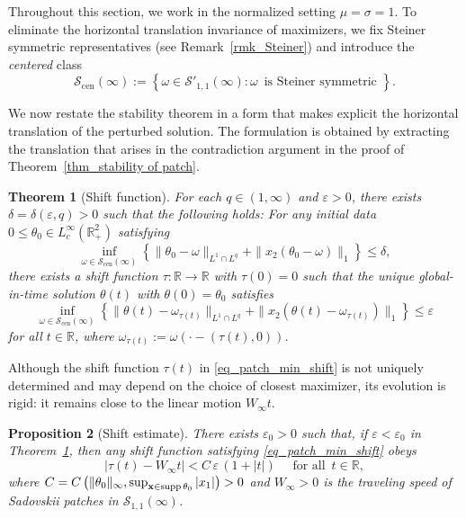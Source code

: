 \documentclass[11pt]{amsart}
\newtheorem{theorem}{Theorem}[section]
\newtheorem{proposition}[theorem]{Proposition}
\theoremstyle{definition}
\theoremstyle{definition}
\numberwithin{equation}{section}
\newcommand{\nrm}[1]{\Vert#1\Vert}
\newcommand{\supp}{{\mathrm{supp}}\,}
\newcommand{\0}{\emptyset}
\newcommand{\dlt}{\delta}
\newcommand{\tht}{\theta}
\newcommand{\omg}{\omega}
\newcommand{\bfx}{{\bf x}}
\newcommand{\bbR}{\mathbb R}
\newcommand{\calS}{\mathcal S}
\newcommand{\ift}{\infty}
\begin{document}
			
			Throughout this section, we work in the normalized setting $\mu = \sigma = 1$.
			To eliminate the horizontal translation invariance of maximizers, we fix Steiner symmetric representatives (see Remark~\ref{rmk_Steiner}) and introduce the \emph{centered} class
			\[
			\calS_{\mathrm{cen}}(\infty)
			:= \left\{
			\omega \in \calS'_{1,1}(\infty): \omega \,\text{ is Steiner symmetric }
			\right\}.
			\]
			
			We now restate the stability theorem in a form that makes explicit the horizontal translation of the perturbed solution.
			The formulation is obtained by extracting the translation that arises in the contradiction argument in the proof of Theorem~\ref{thm_stability of patch}.
			
			\begin{theorem}[Shift function]\label{thm_stability of patch_shift}
				For {each $q \in (1, \infty)$ and} $\varepsilon>0$, there exists $\dlt=\dlt( \varepsilon, q)>0$ such that the following holds:
				For any initial data $0\leq \tht_0\in L_c^\ift(\bbR^2_+)$ satisfying 
				\begin{equation}\label{eq_patch_assumption_shift}
					\inf_{\omg\in \calS_{\mathrm{cen}}(\ift)} \left\{ \| \theta_0 - \omega\|_{ {L^1 \cap L^q} }  + \| x_2(\tht_0-\omg)\|_1\right\} \le \dlt,
				\end{equation}
				there exists a shift function $\tau:\bbR\to\bbR$ with $\tau(0)=0$ such that the unique global-in-time solution $\tht(t)$ with $\tht(0)=\tht_0$ satisfies 
				\begin{equation}\label{eq_patch_min_shift}
					\inf_{\omg\in \calS_{\mathrm{cen}}(\ift)} \left\{ \| \theta(t) - \omega_{\tau(t)}\|_{{L^1 \cap L^q}  }  + \| x_2(\tht(t)-\omg_{\tau(t)})\|_1\right\} \leq \varepsilon
				\end{equation}
				for all $t \in \bbR$, where $\omega_{\tau(t)}:=\omega(\cdot-(\tau(t),0))$. 
			\end{theorem}
			
			
			Although the shift function $\tau(t)$ in \eqref{eq_patch_min_shift} is not uniquely determined and may depend on the choice of closest maximizer, its evolution is rigid: it remains close to the linear motion $W_\infty t$.
			
			
			\begin{proposition}[Shift estimate]\label{lem_shift estimate_1}
				There exists $\varepsilon_0>0$ such that, if $\varepsilon < \varepsilon_0$ in Theorem~\ref{thm_stability of patch_shift}, 
				then any shift function satisfying \eqref{eq_patch_min_shift} obeys
				\begin{equation}\label{tech eq: shift estimate_1} 
					|\tau(t)-W_\ift t|<C\,\varepsilon\,(1 + |t|) \quad \textrm{ for all }\, t\in\bbR,
				\end{equation}
				where $C=C\left(\nrm{\tht_0}_\ift, \sup_{\bfx\in\supp\tht_0}|x_1|\right)>0$ and $W_\ift>0$ is the traveling speed of Sadovskii patches in $\calS_{1,1}(\ift)$.
			\end{proposition}
			
\end{document}
